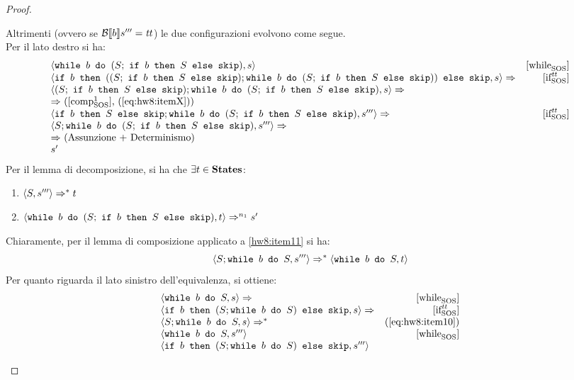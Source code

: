 \begin{proof}
\begin{itemize}
  Altrimenti (ovvero se $\B{b}''' = \semtrue$) le due configurazioni evolvono
  come segue. \\
  Per il lato destro si ha:
  $$
  \begin{array}{lr}
  \confSs{\wbS{b}{(S;\ \ifABC{b}{S}{\skipForFriends})}}{s} & \whileSOS \\
  \confSs{\ifABC{b}
            {((S;\ \ifABC{b}{S}{\skipForFriends});
              \wbS{b}{(S;\ \ifABC{b}{S}{\skipForFriends})})}
            {\skipForFriends}
         }{s} \Rar{ }& \ifttSOS \\
  \confSs{  (S;\ \ifABC{b}{S}{\skipForFriends});
            \wbS{b}{(S;\ \ifABC{b}{S}{\skipForFriends})}
         }{s} \Rar{ } \\
  \Rar{ } (\text{$\compoSOS$, (\ref{eq:hw8:itemX})})\\
  \confSs{  \ifABC{b}{S}{\skipForFriends};
            \wbS{b}{(S;\ \ifABC{b}{S}{\skipForFriends})}
         }{s'''} \Rar{ } & \ifttSOS \\
  \confSs{  S;
            \wbS{b}{(S;\ \ifABC{b}{S}{\skipForFriends})}
         }{s'''} \Rar{ } \\
  \Rar{ } (\text{Assunzione + Determinismo})\\
  s'
  \end{array}
  $$
  Per il lemma di decomposizione, si ha che $\exists{t}\in\states$:
  \begin{enumerate}[label=(\alph*)]
    \item $\confSs{S}{s'''} \Rar{*} t$
    \label{hw8:item11}
    \item $\confSs{\wbS{b}{(S;\ \ifABC{b}{S}{\skipForFriends})}}{t} \Rar{n_1} s'$
    \label{hw8:item12}
  \end{enumerate}
  Chiaramente, per il lemma di composizione applicato a \ref{hw8:item11} si ha:
  \begin{equation}
  \langle{}S; \mbox{\normalfont{\texttt{while }}} b \textrm{\normalfont{\texttt{ do }}} S, s'''\rangle{} \Rightarrow^{*} \langle{}\mbox{\normalfont{\texttt{while }}} b \textrm{\normalfont{\texttt{ do }}} S, t\rangle{}
  \label{eq:hw8:item13}
  \end{equation}
  Per quanto riguarda il lato sinistro dell'equivalenza, si ottiene:
  $$
  \begin{array}{lr}
  \confSs{\wbS{b}{S}}{s} \Rar{ }  & \whileSOS \\
  \confSs{\ifABC{b}{(S;\wbS{b}{S})}{\skipForFriends}}{s} \Rar{ } & \ifttSOS\\
  \confSs{S; \wbS{b}{S}}{s} \Rar{*} & (\text{\ref{eq:hw8:item10}})\\
  \confSs{\wbS{b}{S}}{s'''}  & \whileSOS \\
  \confSs{\ifABC{b}{(S;\wbS{b}{S})}{\skipForFriends}}{s'''}

\end{array}$$
\end{itemize}
\end{proof}
